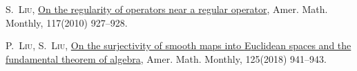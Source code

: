 \documentclass[12pt]{ctexbook}
\theoremstyle{definition}
\theoremstyle{remark}
\begin{document}
%
%

\begin{thebibliography}{Liu10}


\textsc{S.~Liu}, \href{https://doi.org/10.4169/000298910X523425}{On the
  regularity of operators near a regular operator}, Amer. Math. Monthly,
  117(2010) 927--928.

\textsc{P.~Liu}, \textsc{S.~Liu},
  \href{https://doi.org/10.1080/00029890.2018.1521241}{On the surjectivity of
  smooth maps into {E}uclidean spaces and the fundamental theorem of algebra},
  Amer. Math. Monthly, 125(2018) 941--943.

\end{thebibliography}
\end{document}
